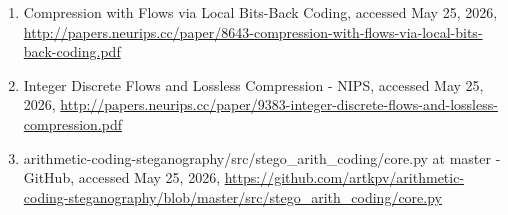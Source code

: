 \documentclass[
  11pt,
  a4paper,
]{article}
\begin{document}
\begin{enumerate}
  \url{http://staff.ustc.edu.cn/~zhangwm/Paper/2021_18.pdf}
\item
  Compression with Flows via Local Bits-Back Coding, accessed May 25, 2026,
  \url{http://papers.neurips.cc/paper/8643-compression-with-flows-via-local-bits-back-coding.pdf}
\item
  Integer Discrete Flows and Lossless Compression - NIPS, accessed May 25, 2026,
  \url{http://papers.neurips.cc/paper/9383-integer-discrete-flows-and-lossless-compression.pdf}
\item
  arithmetic-coding-steganography/src/stego\_arith\_coding/core.py at master - GitHub, accessed May 25, 2026,
  \url{https://github.com/artkpv/arithmetic-coding-steganography/blob/master/src/stego_arith_coding/core.py}
\end{enumerate}
\end{document}
